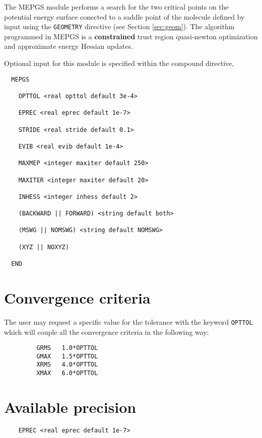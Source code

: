 %
%
\label{sec:mepgs}


The MEPGS module performs a search for the two critical points on the
potential energy surface conected to a saddle point of the molecule 
defined by input using the \verb+GEOMETRY+ directive (see Section \ref{sec:geom}). 
The algorithm programmed in MEPGS is a {\bf constrained} trust region quasi-newton optimization and approximate energy Hessian updates.


Optional input for this module is specified within the compound
directive,
\begin{verbatim}
  MEPGS 

    OPTTOL <real opttol default 3e-4>

    EPREC <real eprec default 1e-7>

    STRIDE <real stride default 0.1>

    EVIB <real evib default 1e-4>

    MAXMEP <integer maxiter default 250>

    MAXITER <integer maxiter default 20>

    INHESS <integer inhess default 2>

    (BACKWARD || FORWARD) <string default both>

    (MSWG || NOMSWG) <string default NOMSWG>

    (XYZ || NOXYZ) 

  END
\end{verbatim}

\sloppy

\section{Convergence criteria}

The user may request a specific value for the tolerance with the keyword \verb+OPTTOL+ which will couple all the convergence criteria in the following way:

\begin{verbatim}
         GRMS   1.0*OPTTOL
         GMAX   1.5*OPTTOL
         XRMS   4.0*OPTTOL
         XMAX   6.0*OPTTOL
\end{verbatim}

\section{Available precision}

\begin{verbatim}
    EPREC <real eprec default 1e-7>
\end{verbatim}

